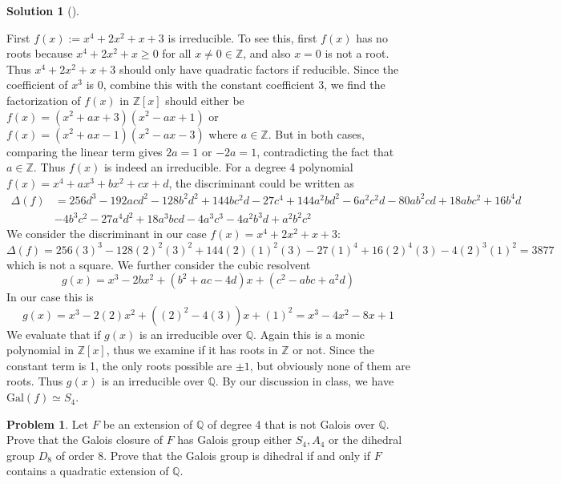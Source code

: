 \documentclass{article}
\theoremstyle{definition}
\newtheorem{prob}{Problem}
\newtheorem*{sol}{Solution}
\newenvironment{sols}[1][]{%
  \begin{sol}[#1]$ $\par\nobreak\ignorespaces
}{%
  \end{sol}
}
\newcommand{\QQ}{\mathbb Q}
\newcommand{\ZZ}{\mathbb Z}
\newcommand{\Gal}{\text{Gal}}
\begin{document}
\begin{sols}
	First $f(x) := x^4 + 2x^2 + x + 3$ is irreducible.
	To see this, first $f(x)$ has no roots because $x^4 + 2 x^2 + x \geq 0$ for all $x \neq 0 \in \ZZ$, and	also $x = 0$ is not a root.
	Thus $x^4 + 2x^2 + x + 3$ should only have quadratic factors if reducible.
	Since the coefficient of $x^3$ is 0, combine this with the constant coefficient 3, we find the factorization of $f(x)$ in $\ZZ[x]$ should either be $f(x) = (x^2 + ax + 3) (x^2 - ax + 1)$ or $f(x) = (x^2 + ax - 1) (x^2 - ax - 3)$ where $a \in \ZZ$.
	But in both cases, comparing the linear term gives $2a = 1$ or $-2 a = 1$, contradicting the fact that $a \in \ZZ$.
	Thus $f(x)$ is indeed an irreducible.
	For a degree 4 polynomial $f(x) = x^4 + a x^3 + b x^2 + c x + d$, the discriminant could be written as
	\[
		\begin{split}
			\Delta(f) &= 256 d^3 - 192 a c d^2- 128 b^2 d^2 + 144 b c^2 d - 27 c^4 + 144 a^2 b d^2 - 6 a^2 c^2 d - 80 a b^2 c d + 18 a b c^2 + 16 b^4 d\\
			&- 4 b^3 c^2 - 27 a^4 d^2 + 18 a^3 bcd - 4 a^3 c^3 - 4 a^2 b^3 d + a^2 b^2 c^2
		\end{split}
	\]
	We consider the discriminant in our case $f(x) = x^4 + 2x^2 + x + 3$:
	\[
		\Delta(f) = 256 (3)^3  - 128 (2)^2 (3)^2  + 144 (2) (1)^2 (3) - 27 (1)^4 + 16 (2)^4 (3)  - 4 (2)^3 (1)^2 = 3877 
	\]
	which is not a square.
	We further consider the cubic resolvent
	\[
		g(x) = x^3 - 2 b x^2 + (b^2 + ac - 4d) x + (c^2 - abc + a^2 d)
	\]
	In our case this is 
	\[
		g(x) = x^3 - 2 (2) x^2 + ((2)^2 - 4 (3)) x + (1)^2 = x^3 - 4 x^2 - 8x + 1
	\]
	We evaluate that if $g(x)$ is an irreducible over $\QQ$.
	Again this is a monic polynomial in $\ZZ[x]$, thus we examine if it has roots in $\ZZ$ or not.
	Since the constant term is 1, the only roots possible are $\pm 1$, but obviously none of them are roots.
	Thus $g(x)$ is an irreducible over $\QQ$. 
	By our discussion in class, we have $\Gal(f) \simeq S_4$.
\end{sols}

\setcounter{prob}{10}
\begin{prob}
	Let $F$ be an extension of $\QQ$ of degree 4 that is not Galois over $\QQ$.
	Prove that the Galois closure of $F$ has Galois group either $S_4, A_4$ or the dihedral group $D_8$ of order 8.
	Prove that the Galois group is dihedral if and only if $F$ contains a quadratic extension of $\QQ$.
\end{prob}
\end{document}
